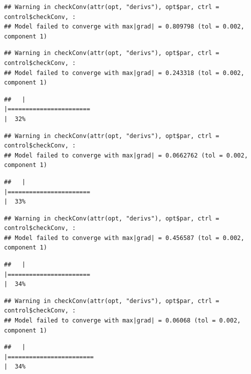 \documentclass[
  12pt,
]{book}
\begin{document}
\begin{verbatim}
## Warning in checkConv(attr(opt, "derivs"), opt$par, ctrl = control$checkConv, :
## Model failed to converge with max|grad| = 0.809798 (tol = 0.002, component 1)
\end{verbatim}

\begin{verbatim}
## Warning in checkConv(attr(opt, "derivs"), opt$par, ctrl = control$checkConv, :
## Model failed to converge with max|grad| = 0.243318 (tol = 0.002, component 1)
\end{verbatim}

\begin{verbatim}
##   |                                                                              |=======================                                               |  32%
\end{verbatim}

\begin{verbatim}
## Warning in checkConv(attr(opt, "derivs"), opt$par, ctrl = control$checkConv, :
## Model failed to converge with max|grad| = 0.0662762 (tol = 0.002, component 1)
\end{verbatim}

\begin{verbatim}
##   |                                                                              |=======================                                               |  33%
\end{verbatim}

\begin{verbatim}
## Warning in checkConv(attr(opt, "derivs"), opt$par, ctrl = control$checkConv, :
## Model failed to converge with max|grad| = 0.456587 (tol = 0.002, component 1)
\end{verbatim}

\begin{verbatim}
##   |                                                                              |=======================                                               |  34%
\end{verbatim}

\begin{verbatim}
## Warning in checkConv(attr(opt, "derivs"), opt$par, ctrl = control$checkConv, :
## Model failed to converge with max|grad| = 0.06068 (tol = 0.002, component 1)
\end{verbatim}

\begin{verbatim}
##   |                                                                              |========================                                              |  34%
\end{verbatim}
\end{document}
